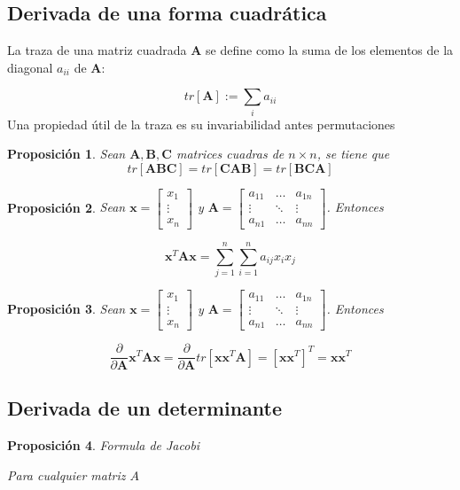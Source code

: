 \documentclass[12pt, twoside]{book}\usepackage[]{graphicx}\usepackage[]{color}
\numberwithin{equation}{section}
\numberwithin{theorem}{section}
\newtheorem{teorema}{Proposición}
\newenvironment{teo}
      {\begin{shaded}\begin{teorema}}
      {\end{teorema}\end{shaded}}
\numberwithin{teorema}{section}
\numberwithin{defi}{section}
\numberwithin{prop}{section}
\numberwithin{defi}{section}
\theoremstyle{plain}
\begin{document}
\subsection{Derivada de una forma cuadrática}
La traza de una matriz cuadrada $\mathbf{A}$ se define como la suma de los elementos de la diagonal $a_{ii}$ de $\mathbf{A}$: 

\begin{equation}
tr[\mathbf{A}]:= \sum_{i}a_{ii}
\end{equation}
Una propiedad útil de la traza es su invariabilidad antes permutaciones

\begin{teorema}
Sean $\mathbf{A,B,C}$ matrices cuadras de $n\times n$, se tiene que
\begin{equation}
tr[\mathbf{ABC}] = tr[\mathbf{CAB}] = tr[\mathbf{BCA}]
\end{equation}
\end{teorema}

\begin{teorema}
Sean $\mathbf{x} = \left[\begin{array}{c} x_{1} \\ \vdots \\ x_{n} \end{array}\right]$ y $\mathbf{A} =
\left[\begin{array}{ccc}
a_{11} & \hdots & a_{1n} \\ 
\vdots & \ddots & \vdots \\ 
a_{n1} & \hdots & a_{nn}
\end{array}\right]$. Entonces

\begin{equation}
\mathbf{x}^{T}\mathbf{Ax} = \sum_{j=1}^{n}\sum_{i=1}^{n}a_{ij}x_{i}x_{j}
\end{equation}
\end{teorema}

\begin{teorema}
Sean $\mathbf{x} = \left[\begin{array}{c} x_{1} \\ \vdots \\ x_{n} \end{array}\right]$ y $\mathbf{A} =
\left[\begin{array}{ccc}
a_{11} & \hdots & a_{1n} \\ 
\vdots & \ddots & \vdots \\ 
a_{n1} & \hdots & a_{nn}
\end{array}\right]$. Entonces

\begin{equation}
\frac{\partial}{\partial \mathbf{A}}\mathbf{x}^{T}\mathbf{Ax} = 
\frac{\partial}{\partial \mathbf{A}}tr\left[\mathbf{xx}^{T}\mathbf{A}\right] = \left[\mathbf{xx}^{T}\right]^{T} = \mathbf{xx}^{T}
\end{equation}

\end{teorema}
\subsection{Derivada de un determinante}

\begin{teo}{Formula de Jacobi}

Para cualquier matriz $A$

\end{teo}
\end{document}
